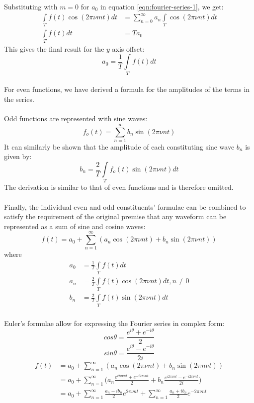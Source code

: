 \documentclass{article}
\begin{document}
Substituting with $m = 0$ for $a_0$ in equation \ref{eqn:fourier-series-1}, we
get:
$$
\begin{aligned}
	\int\limits_{T} f(t) \cos(2 \pi \nu m t) dt &= \sum_{n=0}^{\infty} a_n \int\limits_T \cos
	( 2 \pi \nu n t) dt \\
	\int\limits_T f(t) dt &= T a_0
\end{aligned}$$
This gives the final result for the $y$ axis offset:
\begin{equation}
	a_0 = \frac{1}{T} \int\limits_T f(t) dt
	\label{eqn:fourier-series-yoffset}
\end{equation}

\paragraph*{}
For even functions, we have derived a formula for the amplitudes of the terms
in the series.

\paragraph*{}
Odd functions are represented with sine waves:
$$f_o(t) = \sum^{\infty}_{n=1} b_n \sin(2 \pi \nu n t)$$
It can similarly be shown that the amplitude of each constituting sine wave
$b_n$ is given by:
$$b_n = \frac{2}{T}\int\limits_T f_o(t) \sin(2 \pi \nu n t) dt$$
The derivation is similar to that of even functions and is therefore omitted.

\paragraph*{}
Finally, the individual even and odd constituents' formulae can be combined to
satisfy the requirement of the original premise that any waveform can be
represented as a sum of sine and cosine waves:
$$f(t) = a_0 + \sum^{\infty}_{n=1} (a_n \cos(2 \pi \nu n t) + b_n \sin(2 \pi
\nu n t))$$
where
\begin{align*}
	a_0 &= \frac{1}{T} \int\limits_T f(t) dt \\
	a_n &= \frac{2}{T} \int\limits_T f(t) \cos(2 \pi \nu n t) dt, n \neq 0 \\
	b_n &= \frac{2}{T} \int\limits_T f(t) \sin(2 \pi \nu n t) dt \\
\end{align*}

Euler's formulae allow for expressing the Fourier series in complex form:
$$cos \theta = \frac{e^{i\theta} + e^{-i\theta}}{2}$$
$$sin \theta = \frac{e^{i\theta} - e^{-i\theta}}{2i}$$
\begin{equation*}
	\begin{aligned}
		f(t) &= a_0 + \sum^{\infty}_{n=1}(a_n \cos(2 \pi \nu n t) + b_n \sin(2
		\pi n \nu t)) \\
		& = a_0 + \sum^{\infty}_{n=1}\Big(
		a_n \frac{e^{i 2 \pi \nu n t} + e^{-i 2 \pi \nu n t}}{2} + 
		b_n \frac{e^{i 2 \pi \nu n t} - e^{-i 2 \pi \nu n t}}{2i}\Big) \\
		&= a_0 + \sum^{\infty}_{n=1} \frac{a_n - ib_n}{2}e^{2 \pi \nu n t} +
		\sum^{\infty}_{n=1} \frac{a_n + ib_n}{2} e^{-2 \pi \nu n t}
	\end{aligned}
\end{equation*}
\end{document}
